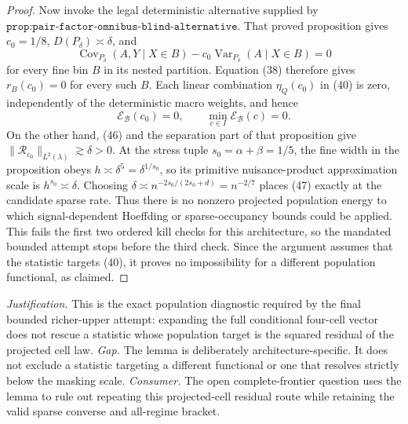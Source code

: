 \documentclass{article}
\begin{document}
\begin{proof}
Now invoke the legal deterministic alternative supplied by \(\texttt{prop:pair-factor-omnibus-blind-alternative}\).  That proved proposition gives \(c_0=1/8\), \(D(P_\delta)\asymp\delta\), and
\[
 \operatorname{Cov}_{P_\delta}(A,Y\mid X\in B)
 -c_0\operatorname{Var}_{P_\delta}(A\mid X\in B)=0
\]
for every fine bin \(B\) in its nested partition.  Equation (38) therefore gives \(r_B(c_0)=0\) for every such \(B\).  Each linear combination \(\eta_Q(c_0)\) in (40) is zero, independently of the deterministic macro weights, and hence
\[
 \mathcal E_{\mathcal B}(c_0)=0,
 \qquad
 \min_{c\in I}\mathcal E_{\mathcal B}(c)=0.                                           \tag{47}
\]
On the other hand, (46) and the separation part of that proposition give \(\|\mathcal R_{c_0}\|_{L^2(\lambda)}\gtrsim\delta>0\).  At the stress tuple \(s_0=\alpha+\beta=1/5\), the fine width in the proposition obeys \(h\asymp\delta^5=\delta^{1/s_0}\), so its primitive nuisance-product approximation scale is \(h^{s_0}\asymp\delta\).  Choosing \(\delta\asymp n^{-2s_0/(2s_0+d)}=n^{-2/7}\) places (47) exactly at the candidate sparse rate.  Thus there is no nonzero projected population energy to which signal-dependent Hoeffding or sparse-occupancy bounds could be applied.  This fails the first two ordered kill checks for this architecture, so the mandated bounded attempt stops before the third check.  Since the argument assumes that the statistic targets (40), it proves no impossibility for a different population functional, as claimed.
\end{proof}
\par\smallskip\noindent \textit{Justification.} This is the exact population diagnostic required by the final bounded richer-upper attempt: expanding the full conditional four-cell vector does not rescue a statistic whose population target is the squared residual of the projected cell law. \textit{Gap.} The lemma is deliberately architecture-specific.  It does not exclude a statistic targeting a different functional or one that resolves strictly below the masking scale. \textit{Consumer.} The open complete-frontier question uses the lemma to rule out repeating this projected-cell residual route while retaining the valid sparse converse and all-regime bracket.
\end{document}
